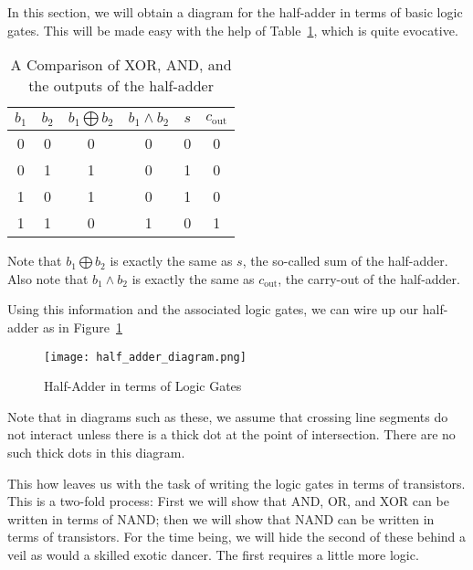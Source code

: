 In this section, we will obtain a diagram for the half-adder in terms of basic logic gates.  This will be made easy with the help of Table~\ref{table:xor_and_half-adder}, which is quite evocative.
\begin{table}
	\begin{center}
		\begin{tabular}{cccccc}
			$b_1$ & $b_2$ & $b_1\bigoplus b_2$ & $b_1\wedge b_2$ & $s$ & $c_\text{out}$  \\ \hline
			0  &   0   &    0          &        0        & 0   &  0         \\
			0  &   1   &    1          &        0        & 1   &  0         \\
			1  &   0   &    1          &        0        & 1   &  0         \\
			1  &   1   &    0          &        1        & 0   &  1         \\
		\end{tabular}
	\end{center}\caption{A Comparison of XOR, AND, and the outputs of the half-adder}\label{table:xor_and_half-adder}
\end{table}
Note that $b_1\bigoplus b_2$ is exactly the same as $s$, the so-called sum of the half-adder.  Also note that $b_1\wedge b_2$ is exactly the same as $c_\text{out}$, the carry-out of the half-adder.

Using this information and the associated logic gates, we can wire up our half-adder as in Figure~\ref{figure:half-adder_logic_gates}
\begin{figure}
	\begin{center}			
		\texttt{[image: half\_adder\_diagram.png]}
	\end{center}\caption{Half-Adder in terms of Logic Gates}\label{figure:half-adder_logic_gates}
\end{figure}

Note that in diagrams such as these, we assume that crossing line segments do not interact unless there is a thick dot at the point of intersection.  There are no such thick dots in this diagram.

This how leaves us with the task of writing the logic gates in terms of transistors.  This is a two-fold process: First we will show that AND, OR, and XOR can be written in terms of NAND; then we will show that NAND can be written in terms of transistors.  For the time being, we will hide the second of these behind a veil as would a skilled exotic dancer.  The first requires a little more logic.


